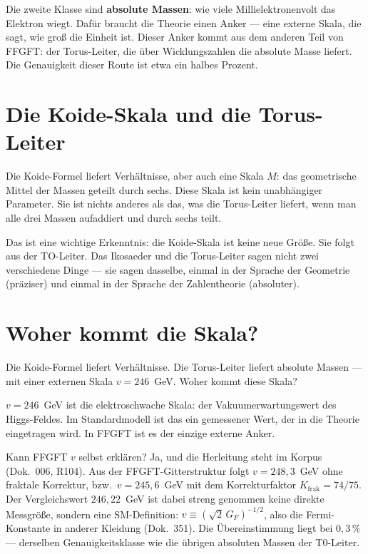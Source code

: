 \documentclass[12pt,oneside]{book}
\begin{document}
Die zweite Klasse sind \textbf{absolute Massen}: wie viele Millielektronenvolt das Elektron wiegt. Dafür braucht die Theorie einen Anker — eine externe Skala, die sagt, wie groß die Einheit ist. Dieser Anker kommt aus dem anderen Teil von FFGFT: der Torus-Leiter, die über Wicklungszahlen die absolute Masse liefert. Die Genauigkeit dieser Route ist etwa ein halbes Prozent.

\section{Die Koide-Skala und die Torus-Leiter}

Die Koide-Formel liefert Verhältnisse, aber auch eine Skala $M$: das geometrische Mittel der Massen geteilt durch sechs. Diese Skala ist kein unabhängiger Parameter. Sie ist nichts anderes als das, was die Torus-Leiter liefert, wenn man alle drei Massen aufaddiert und durch sechs teilt.

Das ist eine wichtige Erkenntnis: die Koide-Skala ist keine neue Größe. Sie folgt aus der TO-Leiter. Das Ikosaeder und die Torus-Leiter sagen nicht zwei verschiedene Dinge — sie sagen dasselbe, einmal in der Sprache der Geometrie (präziser) und einmal in der Sprache der Zahlentheorie (absoluter).

\section{Woher kommt die Skala?}

Die Koide-Formel liefert Verhältnisse. Die Torus-Leiter liefert absolute Massen — mit einer externen Skala $v = 246$~GeV. Woher kommt diese Skala?

$v = 246$~GeV ist die elektroschwache Skala: der Vakuumerwartungswert des Higgs-Feldes. Im Standardmodell ist das ein gemessener Wert, der in die Theorie eingetragen wird. In FFGFT ist es der einzige externe Anker.

Kann FFGFT $v$ selbst erklären? Ja, und die Herleitung steht im Korpus (Dok.~006, R104). Aus der FFGFT-Gitterstruktur folgt $v = 248{,}3$~GeV ohne fraktale Korrektur, bzw.\ $v = 245{,}6$~GeV mit dem Korrekturfaktor $K_\text{frak} = 74/75$. Der Vergleichswert $246{,}22$~GeV ist dabei streng genommen keine direkte Messgröße, sondern eine SM-Definition: $v \equiv (\sqrt{2}\,G_F)^{-1/2}$, also die Fermi-Konstante in anderer Kleidung (Dok.~351). Die Übereinstimmung liegt bei $0{,}3\,\%$ --- derselben Genauigkeitsklasse wie die übrigen absoluten Massen der T0-Leiter.
\end{document}
